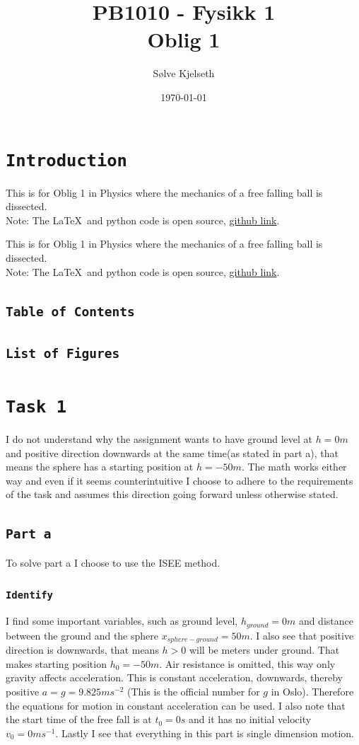 \documentclass{article}
\title{\fontsize{24}{36}\selectfont PB1010 - Fysikk 1\\ %
Oblig 1} %
\author{Sølve Kjelseth} %
\date{\today} %
\makeatletter
\let\oldsection\section
\renewcommand{\section}[1]{%
  \oldsection{\texttt{#1}} %
  \setcounter{subsection}{-1} %
  \setcounter{figure}{-1} %
}
\let\oldsubsection\subsection
\renewcommand{\subsection}[1]{%
  \oldsubsection{\texttt{#1}}%
  \setcounter{subsubsection}{-1}%
}
\let\oldsubsubsection\subsubsection
\renewcommand{\subsubsection}[1]{%
  \oldsubsubsection{\texttt{#1}}%
}
\renewcommand{\tableofcontents}{%
    \subsection{Table of Contents} %
    \@starttoc{toc}%
}
\renewcommand{\listoffigures}{%
    \subsection{List of Figures} %
    \@starttoc{lof}%
}
\newcommand{\introduction}[1][]{%
    \addtocontents{toc}{\protect\setcounter{tocdepth}{0}} %
    \section{Introduction} %
    \ifx\relax#1\relax %
    \else
        #1 %
    \fi
    \tableofcontents %
    \clearpage
    \listoffigures %
    \addtocontents{toc}{\protect\setcounter{tocdepth}{2}} %
}
\makeatother
\begin{document}
\maketitle %


\introduction[
This is for Oblig 1 in Physics where the mechanics of a free falling ball is dissected.\\
Note: The \LaTeX\ and python code is open source, \href{https://github.com/Kjelseth/Physics/tree/4eafb2ed19a347886ba41ad8a429e05fd7a3dd91/Fysikk1/Oblig1}{github link}.
]


\section{Task 1}
I do not understand why the assignment wants to have ground level at \(h = 0m\) and positive direction downwards at the same time(as stated in part a), that means the sphere has a starting position at \(h = -50m\). The math works either way and even if it seems counterintuitive I choose to adhere to the requirements of the task and assumes this direction going forward unless otherwise stated.

\subsection{Part a}
To solve part a I choose to use the ISEE method.

\subsubsection{Identify}
I find some important variables, such as ground level, \(h_{ground} = 0m\) and distance between the ground and the sphere \(x_{sphere-ground} = 50m\). I also see that positive direction is downwards, that means \(h > 0\) will be meters under ground. That makes starting position \(h_0 = -50m\). Air resistance is omitted, this way only gravity affects acceleration. This is constant acceleration, downwards, thereby positive \(a = g = 9.825ms^{-2}\) (This is the official number for \(g\) in Oslo). Therefore the equations for motion in constant acceleration can be used. I also note that the start time of the free fall is at \(t_0 = 0s\) and it has no initial velocity \(v_0 = 0ms^{-1}\). Lastly I see that everything in this part is single dimension motion.
\end{document}
